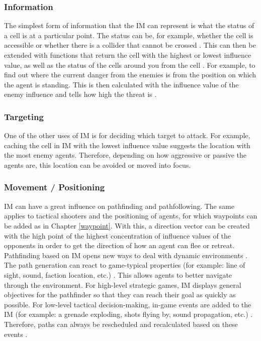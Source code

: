 \documentclass[]{report}
\begin{document}
	\subsubsection{Information}
	The simplest form of information that the \ac{IM} can represent is what the status of a cell is at a particular point. The status can be, for example, whether the cell is accessible or whether there is a collider that cannot be crossed \citep{gameAIPro}. This can then be extended with functions that return the cell with the highest or lowest influence value, as well as the status of the cells around you from the cell \citep{gameAIPro}. 
	For example, to find out where the current danger from the enemies is from the position on which the agent is standing. This is then calculated with the influence value of the enemy influence and tells how high the threat is \citep{gameAIPro}. 
	
	\subsubsection{Targeting}
	One of the other uses of \ac{IM} is for deciding which target to attack. For example, caching the cell in IM with the lowest influence value suggests the location with the most enemy agents. Therefore, depending on how aggressive or passive the agents are, this location can be avoided or moved into focus. \citep{gameAIPro}
	
	\subsubsection{Movement / Positioning}
	\ac{IM} can have a great influence on pathfinding and pathfollowing. The same applies to tactical shooters and the positioning of agents, for which waypoints can be added as in Chapter  \ref{waypoint}.
	With this, a direction vector can be created with the high point of the highest concentration of influence values of the opponents in order to get the direction of how an agent can flee or retreat. \newline \newline
	Pathfinding based on \ac{IM} opens new ways to deal with dynamic environments \citep{imPathfinding}. The path generation can react to game-typical properties (for example: line of sight, sound, faction location, etc.) \citep{imPathfinding}. This allows agents to better navigate through the environment. For high-level strategic games, IM displays general objectives for the pathfinder so that they can reach their goal as quickly as possible. For low-level tactical decision-making, in-game events are added to the \ac{IM} (for example: a grenade exploding, shots flying by, sound propagation, etc.) \citep{imPathfinding}. Therefore, paths can always be rescheduled and recalculated based on these events \citep{imPathfinding}. 
	
\end{document}
